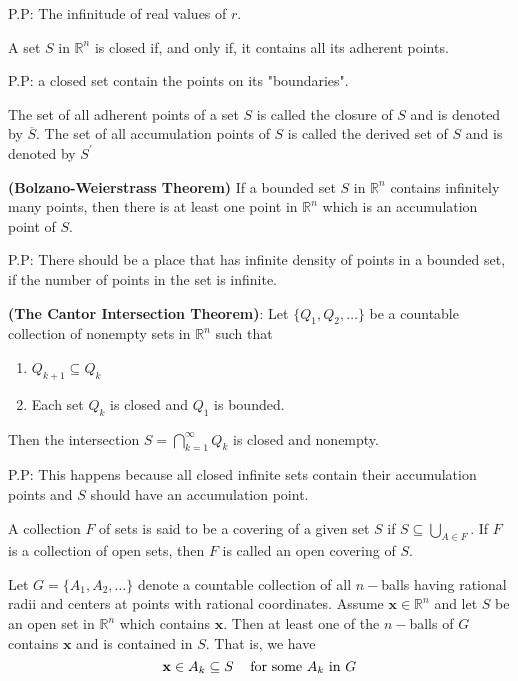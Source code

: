 \documentclass[10pt,a4paper]{book}
\begin{document}
\noindent P.P: The infinitude of real values of $r$.
\begin{Thm}
	A set $S$ in $\mathbb{R}^n$ is closed if, and only if, it contains all its adherent points.
\end{Thm}
\noindent P.P: a closed set contain the points on its "boundaries".
\begin{deff}
 The set of all adherent points of a set $S$ is called the closure of  $S$ and is denoted by $\overline{S}$. The set of all accumulation points  of $S$ is called the derived set of $S$ and is denoted by $S^\prime$
\end{deff}
\begin{Thm}
	\textbf{(Bolzano-Weierstrass Theorem)} If a bounded set $S$ in $\mathbb{R}^n$ contains infinitely many points, then there is at least one point in $\mathbb{R}^n$ which is an accumulation point of $S$. 
\end{Thm}
\noindent P.P: There should be a place that has infinite density of points in a bounded set, if the number of points in the set is infinite.
\begin{Thm}
	\textbf{(The Cantor Intersection Theorem)}: Let $\{Q_1, Q_2, \dots\}$ be a countable collection of nonempty sets in $\mathbb{R}^n$ such that
	\begin{enumerate}
		\item $Q_{k+1} \subseteq Q_k$
		\item Each set $Q_k$ is closed and $Q_1$ is bounded.

	\end{enumerate}
	Then the intersection $S = \bigcap_{k=1}^{\infty} Q_k$ is closed and nonempty.
\end{Thm}
\noindent P.P: This happens because all closed infinite sets contain their accumulation points and $S$ should have an accumulation point.
\begin{deff}
	A collection $F$ of sets is said to be a covering of a given set $S$ if $S \subseteq \bigcup_{A \in F}$. If $F$ is a collection of open sets, then $F$ is called an open covering of $S$.  
\end{deff}
\begin{Thm}
	Let $G =\{A_1, A_2, \dots\}$ denote a countable collection of all $n-$balls having rational radii and centers at points with rational coordinates. Assume $\mathbf{x} \in \mathbb{R}^n$ and let $S$ be an open set in $\mathbb{R}^n$ which contains $\mathbf{x}$. Then at least one of the $n-$balls of $G$ contains $\mathbf{x}$ and is contained in $S$. That is, we have
	$$\mathbf{x} \in A_k \subseteq S \text{ \hspace{0.3cm}for some $A_k$ in $G$}$$
\end{Thm}
\end{document}
